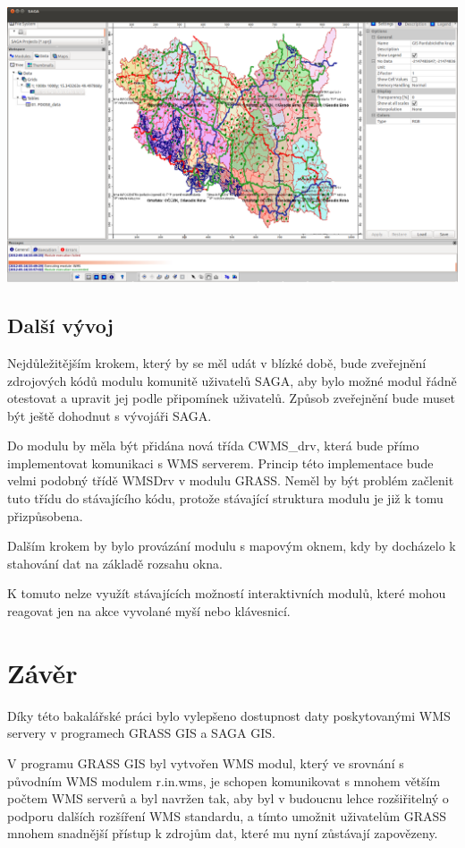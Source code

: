 \documentclass[a4paper,12pt]{article}
\begin{document}
 \includegraphics[scale=0.25]{figures/SAGA_okno4.png}
\subsection{Další vývoj}

Nejdůležitějším krokem, který by se měl udát v blízké době, bude zveřejnění zdrojových kódů modulu komunitě uživatelů SAGA, aby bylo možné modul řádně otestovat a upravit jej podle připomínek uživatelů. Způsob zveřejnění bude muset být ještě dohodnut s vývojáři SAGA.

Do modulu by měla být přidána nová třída CWMS\_drv, která bude přímo implementovat komunikaci s WMS serverem. Princip této implementace bude velmi podobný třídě WMSDrv v modulu GRASS. Neměl by být problém začlenit tuto třídu do stávajícího kódu, protože stávající struktura modulu je již k tomu přizpůsobena.

Dalším krokem by bylo provázání modulu s mapovým oknem, kdy by docházelo k stahování dat na základě rozsahu okna. 

K tomuto nelze využít stávajících možností interaktivních modulů, které mohou reagovat jen na akce vyvolané myší nebo klávesnicí.

\newpage 
\section{Závěr}

Díky této bakalářské práci bylo vylepšeno dostupnost daty poskytovanými WMS servery v programech GRASS GIS a SAGA GIS. 

V programu GRASS GIS byl vytvořen WMS modul, který ve srovnání s původním WMS modulem r.in.wms, je schopen komunikovat s mnohem větším počtem WMS serverů  a byl navržen tak, aby byl v budoucnu lehce rozšiřitelný o podporu dalších rozšíření WMS standardu, a tímto umožnit uživatelům GRASS mnohem snadnější přístup k zdrojům dat, které mu nyní zůstávají zapovězeny. 
\end{document}

